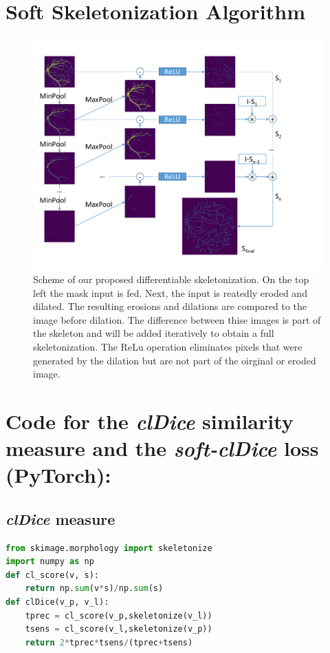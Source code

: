 \section{Soft Skeletonization Algorithm}

\begin{figure}[ht!]
\centering
\includegraphics[width=1\linewidth]{figs/suppl/skel_grafik.pdf}

\caption{Scheme of our proposed differentiable skeletonization. On the top left the mask input is fed. Next, the input is reatedly eroded and dilated. The resulting erosions and dilations are compared to the image before dilation. The difference between thise images is part of the skeleton and will be added iteratively to obtain a full skeletonization. The ReLu operation eliminates pixels that were generated by the dilation but are not part of the oirginal or eroded image.}
\label{example_skel}
\end{figure}



\section{Code for the \textit{clDice} similarity measure and the \textit{soft-clDice} loss (PyTorch):}


\subsection{\textit{clDice} measure}
\footnotesize
\begin{lstlisting}[language=Python]
from skimage.morphology import skeletonize
import numpy as np
def cl_score(v, s):
    return np.sum(v*s)/np.sum(s)
def clDice(v_p, v_l):
    tprec = cl_score(v_p,skeletonize(v_l))
    tsens = cl_score(v_l,skeletonize(v_p))
    return 2*tprec*tsens/(tprec+tsens)
\end{lstlisting}

